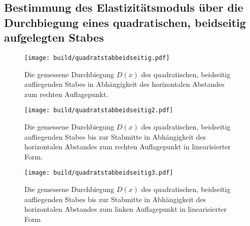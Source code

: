 \subsection{Bestimmung des Elastizitätsmoduls über die Durchbiegung eines quadratischen, beidseitig aufgelegten Stabes}
\begin{figure}
	\centering
	\caption{Die gemessene Durchbiegung $D(x)$ des quadratischen, beidseitig aufliegenden Stabes
	 in Abhängigkeit des horizontalen Abstandes zum rechten Auflagepunkt.}
	\texttt{[image: build/quadratstabbeidseitig.pdf]}
	\label{fig:grad3}
\end{figure}
\begin{figure}
	\centering
	\caption{Die gemessene Durchbiegung $D(x)$ des quadratischen, beidseitig aufliegenden Stabes bis zur Stabmitte
	 in Abhängigkeit des horizontalen Abstandes zum rechten Auflagepunkt in linearisierter Form.}
	\texttt{[image: build/quadratstabbeidseitig2.pdf]}
	\label{fig:grad3}
\end{figure}
\begin{figure}
	\centering
	\caption{Die gemessene Durchbiegung $D(x)$ des quadratischen, beidseitig aufliegenden Stabes bis zur Stabmitte
	 in Abhängigkeit des horizontalen Abstandes zum linken Auflagepunkt in linearisierter Form}
	\texttt{[image: build/quadratstabbeidseitig3.pdf]}
	\label{fig:grad3}
\end{figure}

